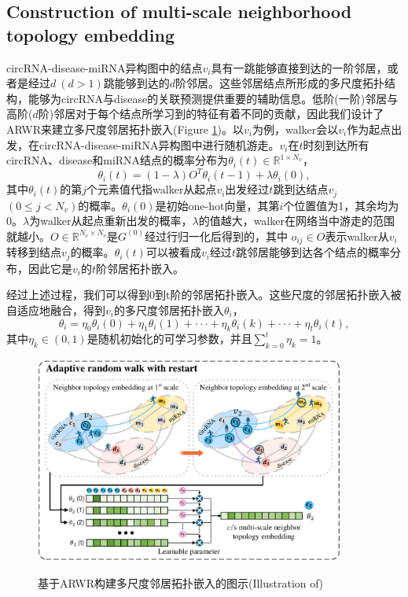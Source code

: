 \documentclass{bioinfo}
\begin{document}
\begin{methods}
\subsection{Construction of multi-scale neighborhood topology embedding}
circRNA-disease-miRNA异构图中的结点$v_i$具有一跳能够直接到达的一阶邻居，或者是经过$d\ (d > 1)$跳能够到达的$d$阶邻居。这些邻居结点所形成的多尺度拓扑结构，能够为circRNA与disease的关联预测提供重要的辅助信息。低阶(一阶)邻居与高阶($d$阶)邻居对于每个结点所学习到的特征有着不同的贡献，因此我们设计了ARWR来建立多尺度邻居拓扑嵌入(Figure \ref{fig:visio3})。以$v_i$为例，walker会以$v_i$作为起点出发，在circRNA-disease-miRNA异构图中进行随机游走。$v_i$在$t$时刻到达所有circRNA、disease和miRNA结点的概率分布为$\theta _i{(t)} \in \mathbb{R}^{1 \times N_v}$，
\begin{equation}
\theta _i{(t)} = (1 - \lambda) O^T \theta _i{(t-1)} + \lambda \theta _i{(0)},
\end{equation}
其中$\theta _i{(t)}$的第$j$个元素值代指walker从起点$v_i$出发经过$t$跳到达结点$v_j$$(0 \leqslant j < N_v)$的概率。$\theta _i{(0)}$是初始one-hot向量，其第$i$个位置值为1，其余均为0。$\lambda$为walker从起点重新出发的概率，$\lambda$的值越大，walker在网络当中游走的范围就越小。$O\in \mathbb{R}^{N_v\times N_v}$是$G^{(0)}$经过行归一化后得到的，其中 $o_{ij}\in O$表示walker从$v_i$转移到结点$v_j$的概率。$\theta _i{(t)}$可以被看成$v_i$经过$t$跳邻居能够到达各个结点的概率分布，因此它是$v_i$的$t$阶邻居拓扑嵌入。

经过上述过程，我们可以得到0到t阶的邻居拓扑嵌入。这些尺度的邻居拓扑嵌入被自适应地融合，得到$v_i$的多尺度邻居拓扑嵌入$\theta _i$，
\begin{equation}
\theta _i = \eta_0  \theta _i{(0)} + \eta_1 \theta _i{(1)} + \cdot \cdot \cdot + \eta_k \theta _i{(k)} + \cdot \cdot \cdot + \eta_t \theta _i{(t)},
\end{equation}
其中$\eta_k\in (0, 1)$是随机初始化的可学习参数，并且$\sum_{k=0}^{t}\eta_k = 1$。


\begin{figure}[t]
	\centering
	\includegraphics[width=4in]{fig/visio3.pdf}\\
	\vspace{0.2cm}
	\caption{基于ARWR构建多尺度邻居拓扑嵌入的图示(Illustration of)}
	\label{fig:visio3}
	\vspace{0.1cm}
\end{figure}




\end{methods}
\end{document}
